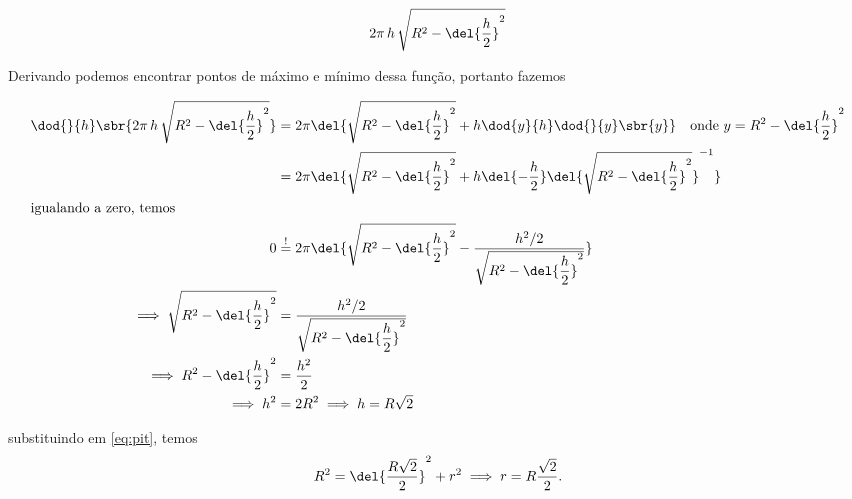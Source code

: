 \documentclass{IMTexam}
\begin{document}
\begin{questions}
\begin{solution}
\begin{multi}
				\begin{equation}\label{eq:max}
					2\pi\,h\,\sqrt{R^{2}-\del{\dfrac{h}{2}}^{2}}
				\end{equation}
			
				Derivando podemos encontrar pontos de máximo e mínimo dessa função, portanto fazemos
				
				\nextcol
				
				\centerline{\scalebox{1}{}}
			\end{multi}
			
			\begin{align*}
				\dod{}{h}\sbr{2\pi\,h\,\sqrt{R^{2}-\del{\dfrac{h}{2}}^{2}}}&=2\pi\del{\sqrt{R^{2}-\del{\dfrac{h}{2}}^{2}}+h\dod{y}{h}\dod{}{y}\sbr{y}}\quad\text{onde } y=R^{2}-\del{\dfrac{h}{2}}^{2}\\
				&=2\pi\del{\sqrt{R^{2}-\del{\dfrac{h}{2}}^{2}}+h\del{-\dfrac{h}{2}}\del{\sqrt{R^{2}-\del{\dfrac{h}{2}}^{2}}}^{-1}}\\
				\intertext{igualando a zero, temos}
				0&\overset{!}{=}2\pi\del{\sqrt{R^{2}-\del{\dfrac{h}{2}}^{2}}-\dfrac{h^{2}/2}{\sqrt{R^{2}-\del{\dfrac{h}{2}}^{2}}}}\\
				\implies \sqrt{R^{2}-\del{\dfrac{h}{2}}^{2}}&=\dfrac{h^{2}/2}{\sqrt{R^{2}-\del{\dfrac{h}{2}}^{2}}}\\
				\implies R^{2}-\del{\dfrac{h}{2}}^{2}&=\dfrac{h^{2}}{2}\\
				\implies h^{2}&=2R^{2}\implies h=R\sqrt{2} 
			\end{align*}
			
			substituindo em \ref{eq:pit}, temos
			\[ R^{2}=\del{\dfrac{R\sqrt{2}}{2}}^{2}+r^{2}\implies r=R\dfrac{\sqrt{2}}{2}. \]
			
		\end{solution}
	
		

\end{questions}
\end{document}
